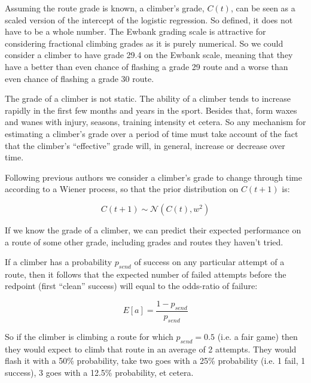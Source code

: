 \documentclass{article}
\begin{document}
Assuming the route grade is known, a climber's grade, $C(t)$, can be seen as a scaled version of the intercept of the logistic regression. So defined, it does not have to be a whole number. The Ewbank grading scale is attractive for considering fractional climbing grades as it is purely numerical. So we could consider a climber to have grade 29.4 on the Ewbank scale, meaning that they have a better than even chance of flashing a grade 29 route and a worse than even chance of flashing a grade 30 route.

The grade of a climber is not static. The ability of a climber tends to increase rapidly in the first few months and years in the sport. Besides that, form waxes and wanes with injury, seasons, training intensity et cetera. So any mechanism for estimating a climber's grade over a period of time must take account of the fact that the climber's ``effective'' grade will, in general, increase or decrease over time.

Following previous authors  \cite{coulom2008whole,scarff2020estimation} we consider a climber's grade to change through time according to a Wiener process, so that the prior distribution on $C(t+1)$ is:

\begin{equation}
C(t+1) \sim \mathcal{N}(C(t), w^2)  
\end{equation}

If we know the grade of a climber, we can predict their expected performance on a route of some other grade, including grades and routes they haven't tried. 


If a climber has a probability $p_{send}$ of success on any particular attempt of a route, then it follows that the expected number of failed attempts before the redpoint (first ``clean'' success) will equal to the odds-ratio of failure:

\begin{equation}
 E\left[a\right]=\frac{1-p_{send}}{p_{send}}
 \end{equation} 
 
 So if the climber is climbing a route for which $p_{send}=0.5$ (i.e. a fair game) then they would expect to climb that route in an average of 2 attempts. They would flash it with a 50\% probability, take two goes with a 25\% probability (i.e. 1 fail, 1 success), 3 goes with a 12.5\% probability, et cetera.
\end{document}
